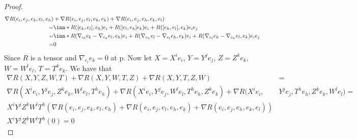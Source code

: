 \documentclass[a4paper]{article}
\begin{document}
\begin{proof}
  \[
    \begin{aligned}
      \nabla R(e_i, e_j, e_k, e_l, e_h) &+ \nabla R(e_i,e_j, e_l, e_h, e_k) + \nabla  R(e_i, e_j, e_h, e_k, e_l)  \\ 
      =& \inn*{R([e_k,e_l],e_h)e_i + R([e_l,e_h]e_k)e_i + R([e_h,e_l],e_k)e_i}{e_j} \\
      =& \inn*{R(\nabla_{e_l}e_k - \nabla_{e_k}e_l, e_h)e_i + R(\nabla_{e_h}e_l - \nabla_{e_l}e_h,e_k)e_i + R(\nabla_{e_l}e_h - \nabla_{e_h}e_l,e_k)e_i}{e_j} \\
      =& 0
    \end{aligned}
  \]
  Since $R$ is a tensor and $\nabla_{e_l}e_k = 0$ at p. Now let $X = X^i e_i$, $Y = Y^j e_j$, $Z = Z^k e_k$, $W = W^l e_l$, $T = T^k e_k$. We have that
  \[
    \begin{aligned}
      \nabla R(X,Y,Z,W,T) + \nabla R(X,Y,W,T,Z) + \nabla R(X,Y,T,Z,W) &= \\
      \nabla R(X^i e_i,Y^j e_j,Z^k e_k,W^l e_l,T^h e_h) + \nabla R(X^i e_i,Y^j e_j,W^l e_l,T^h e_h,Z^k e_k) + \nabla R(X^i e_i,&Y^j e_j,T^h e_h,Z^k e_k,W^l e_l) = \\
      X^i Y^j Z^k W^l T^h \left( \nabla R(e_i, e_j, e_k, e_l, e_h) + \nabla R(e_i,e_j, e_l, e_h, e_k) + \nabla  R(e_i, e_j, e_h, e_k, e_l) \right)  \\
      X^i Y^j Z^k W^l T^h(0) = 0 &
    \end{aligned}
  \]
\end{proof}
\end{document}
